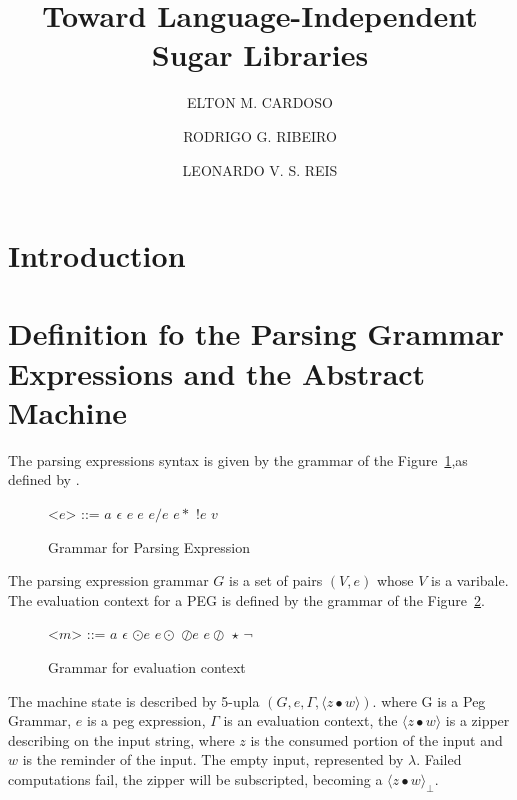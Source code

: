 \documentclass[manuscript, review, sigconf]{acmart}
\title{Toward Language-Independent Sugar Libraries}
\author{ELTON M. CARDOSO}
\affiliation{%
  \institution{Universidade Federal de Ouro Preto}
  \city{Ouro Preto}
  \state{Minas Gerais}
  \country{Brazil}
}
\author{RODRIGO G. RIBEIRO}
\affiliation{%
  \institution{Universidade Federal de Ouro Preto}
  \city{Ouro Preto}
  \state{Minas Gerais}
  \country{Brazil}
}
\author{LEONARDO V. S. REIS}
\affiliation{%
  \institution{Universidade Federal de Juiz de Fora}
  \city{Juiz de Fora}
  \state{Minas Gerais}
  \country{Brazil}
}
\newcommand{\zpp}[2]{\langle #1\bullet #2 \rangle}
\newcommand{\zppf}[2]{\langle #1\bullet #2 \rangle_{\bot}}
\begin{document}
\begin{abstract}

\end{abstract}


\maketitle
\renewcommand{\shortauthors}{CARDOSO et al.}

\section{Introduction} \label{sec:intro}


\section{Definition fo the Parsing Grammar Expressions and the Abstract Machine} \label{sec:apeg}


The parsing expressions syntax is given by the grammar of the Figure~\ref{fig:grm-peg},as defined by \cite{Ford04}.

\begin{figure}[H]
  \begin{grammar} 
    <$e$> ::= $a$
    \alt $\epsilon$
    \alt $e\;e$
    \alt $e / e$
    \alt $e*$
    \alt $!e$
    \alt $v$
  \end{grammar}
 \caption{Grammar for Parsing Expression }
 \label{fig:grm-peg}
\end{figure}

The parsing expression grammar $G$ is a set of pairs $(V,e)$ whose $V$ is a varibale. The evaluation context for a PEG is defined by the grammar of the Figure~\ref{fig:grm-ctx}.

\begin{figure}[H]   
   \begin{grammar} 
     <$m$> ::= $a$
     \alt $\epsilon$
     \alt $\odot e$
     \alt $e \odot$
     \alt $\oslash e$
     \alt $e \oslash$
     \alt $\star$
     \alt $\neg$
   \end{grammar}
   \caption{Grammar for evaluation context }
   \label{fig:grm-ctx}
\end{figure}




The machine state is described by 5-upla $(G, e,\Gamma , \zpp{z}{w})$. where G is a Peg Grammar, $e$ is a peg expression, $\Gamma$ is an evaluation context, the  $\zpp{z}{w}$ is a zipper describing on the input string, where $z$ is the consumed portion of the input and $w$ is the reminder of the input. The empty input, represented by $\lambda$. Failed computations fail, the zipper will be subscripted, becoming a $\zppf{z}{w}$. 
\end{document}
